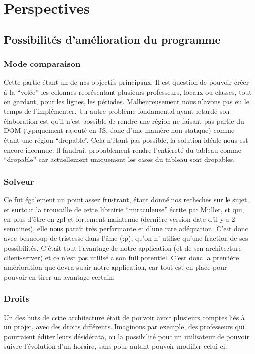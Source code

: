 \chapter{Perspectives}

\section{Possibilités d'amélioration du programme}

\subsection{Mode comparaison}
Cette partie étant un de nos objectifs principaux. Il est question de pouvoir créer à la
\enquote{volée} les colonnes représentant plusieurs professeurs, locaux ou classes, tout
 en gardant, pour les lignes, les périodes. Malheureusement nous n'avons pas eu le temps de l'implémenter. Un autre problème fondamental ayant retardé son élaboration est qu'il n'est  possible de rendre une région ne faisant pas partie du DOM (typiquement rajouté 
en JS, donc d'une manière non-statique) comme étant une région \enquote{dropable}.
Cela n'étant pas possible, la solution idéale nous est encore inconnue. Il faudrait probablement rendre l'entièreté du tableau comme \enquote{dropable} car actuellement uniquement les cases du tableau sont dropables.

\subsection{Solveur}
Ce fut également un point assez frustrant, étant donné nos recheches 
sur le sujet, et surtout la trouvaille de cette librairie ``miraculeuse'' écrite 
par Muller, et qui, en plus d'être en gpl et fortement maintenue (dernière 
version date d'il y a 2 semaines), elle nous paraît très performante et d'une 
rare adéquation.  C'est donc avec beaucoup de tristesse dans l’âme (:p), qu'on n'
utilise qu'une fraction de ses possibilités.  C'était tout l'avantage de notre 
application (et de son architecture client-server) et ce n'est pas utilisé a son
full potentiel.  C'est donc la première amérioration que devra subir notre
application, car tout est en place pour pouvoir en tirer un avantage certain.

\subsection{Droits}
Un des buts de cette architecture était de pouvoir avoir plusieurs comptes liés à
un projet, avec des droits différents. Imaginons par exemple, des professeurs qui pourraient
 éditer leurs désidérata, ou la possibilité pour un utilisateur de pouvoir suivre l'évolution d'un horaire, sans pour autant pouvoir modifier celui-ci.

